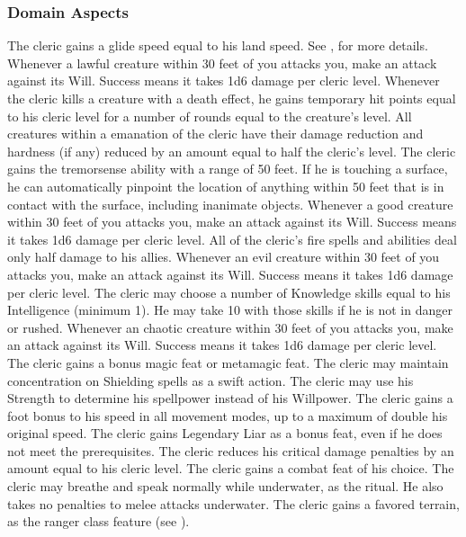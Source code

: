 \subsubsection{Domain Aspects}\label{Domain Aspects}

The cleric gains a glide speed equal to his land speed.
See , for more details.
Whenever a lawful creature within 30 feet of you attacks you, make an attack against its Will.
Success means it takes 1d6 damage per cleric level.
Whenever the cleric kills a creature with a death effect, he gains temporary hit points equal to his cleric level for a number of rounds equal to the creature's level.
All creatures within a \areamed emanation of the cleric have their damage reduction and hardness (if any) reduced by an amount equal to half the cleric's level.
The cleric gains the tremorsense ability with a range of 50 feet.
If he is touching a surface, he can automatically pinpoint the location of anything within 50 feet that is in contact with the surface, including inanimate objects.
Whenever a good creature within 30 feet of you attacks you, make an attack against its Will.
Success means it takes 1d6 damage per cleric level.
All of the cleric's fire spells and abilities deal only half damage to his allies.
Whenever an evil creature within 30 feet of you attacks you, make an attack against its Will.
Success means it takes 1d6 damage per cleric level.
The cleric may choose a number of Knowledge skills equal to his Intelligence (minimum 1).
He may take 10 with those skills if he is not in danger or rushed.
Whenever an chaotic creature within 30 feet of you attacks you, make an attack against its Will.
Success means it takes 1d6 damage per cleric level.
The cleric gains a bonus magic feat or metamagic feat.
The cleric may maintain concentration on Shielding spells as a swift action.
The cleric may use his Strength to determine his spellpower instead of his Willpower.
The cleric gains a  foot bonus to his speed in all movement modes, up to a maximum of double his original speed.
The cleric gains Legendary Liar as a bonus feat, even if he does not meet the prerequisites.
The cleric reduces his critical damage penalties by an amount equal to his cleric level.
The cleric gains a combat feat of his choice.
 The cleric may breathe and speak normally while underwater, as the 
ritual.
He also takes no penalties to melee attacks underwater.
The cleric gains a favored terrain, as the ranger class feature (see ).


